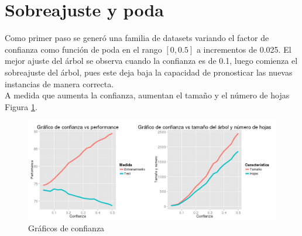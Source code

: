 \documentclass[]{article}
\begin{document}
\section{Sobreajuste y poda}
Como primer paso se generó una familia de datasets variando el factor de confianza como función de poda en el rango $[0,0.5]$ a incrementos de 0.025. El mejor ajuste del árbol se observa cuando la confianza es de 0.1, luego comienza el sobreajuste del árbol, pues este deja baja la capacidad de pronosticar las nuevas instancias de manera correcta.\\
A medida que aumenta la confianza, aumentan el tamaño y el número de hojas Figura \ref{1.P1Conf}.




	\begin{figure}[H]
		\includegraphics[scale = 0.38]{1_3_Conf_Perf_Num}
		\caption[Confianza vs ajuste]{Gráficos de confianza}
		\label{1.P1Conf}
	\end{figure}



%
%

\end{document}
